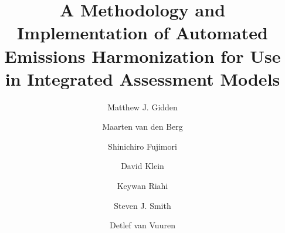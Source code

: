 \begin{frontmatter}

\title{A Methodology and Implementation of Automated Emissions Harmonization for Use in Integrated Assessment Models}

\author[iiasa]{Matthew J. Gidden}

\author[pbl]{Maarten van den Berg}
\author[nies]{Shinichiro Fujimori}
\author[pik]{David Klein}
\author[iiasa]{Keywan Riahi}
\author[pnnl]{Steven J. Smith}
\author[pbl]{Detlef van Vuuren}

\address[iiasa]{International Institute for Applied Systems Analysis,
  Schlossplatz 1, A-2361 Laxenburg, Austria}
\address[nies]{National Institute for Environmental Studies, Tsukuba, Japan}
\address[pbl]{PBL Netherlands Environmental Assessment Agency, Postbus 30314, 2500 GH The Hague, Netherlands}
\address[pik]{Potsdam Institute for Climate Impact Research (PIK), Member of the Leibniz Association, P.O. Box 60 12 03, D-14412 Potsdam, Germany}
\address[pnnl]{Joint Global Change Research Institute, 5825 University Research Court, Suite 3500, College Park, MD 20740}


\end{frontmatter}
